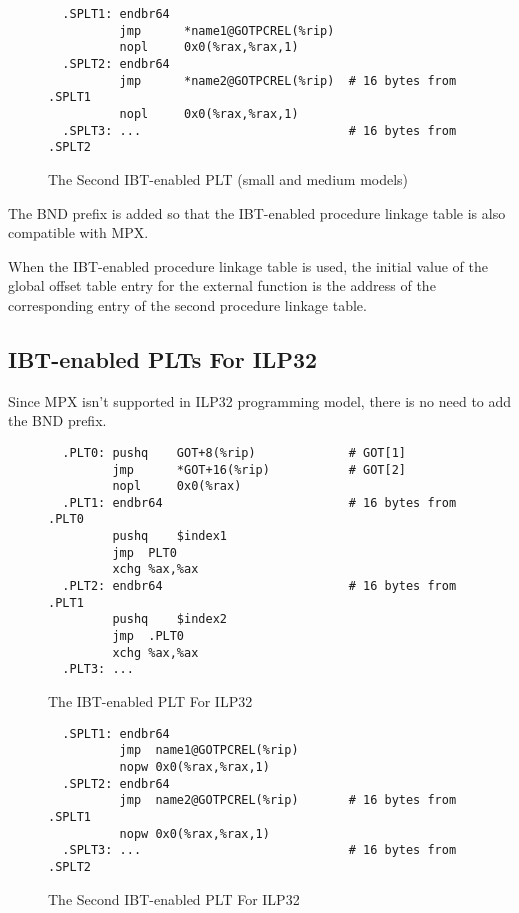 \begin{figure}[H]
\Hrule
\caption{The Second IBT-enabled PLT (small and medium models)}
\label{ibt_sec_small_med_plt}
\begin{footnotesize}
\begin{verbatim}
  .SPLT1: endbr64
          jmp      *name1@GOTPCREL(%rip)
          nopl     0x0(%rax,%rax,1)
  .SPLT2: endbr64
          jmp      *name2@GOTPCREL(%rip)  # 16 bytes from .SPLT1
          nopl     0x0(%rax,%rax,1)
  .SPLT3: ...                             # 16 bytes from .SPLT2
\end{verbatim}%
\end{footnotesize}
\Hrule
\end{figure}

The BND prefix is added so that the IBT-enabled procedure linkage table is
also compatible with MPX.

When the IBT-enabled procedure linkage table is used, the initial value of
the global offset table entry for the external function is the address of
the corresponding entry of the second procedure linkage table.

\subsection{IBT-enabled PLTs For ILP32}

Since MPX isn't supported in ILP32 programming model, there is no
need to add the BND prefix.

\begin{figure}[H]
\Hrule
\caption{The IBT-enabled PLT For ILP32}
\label{ibt_small_med_plt_ipl32}
\begin{footnotesize}
\begin{verbatim}
  .PLT0: pushq    GOT+8(%rip)             # GOT[1]
         jmp      *GOT+16(%rip)           # GOT[2]
         nopl     0x0(%rax)
  .PLT1: endbr64                          # 16 bytes from .PLT0
         pushq    $index1
         jmp  PLT0
         xchg %ax,%ax
  .PLT2: endbr64                          # 16 bytes from .PLT1
         pushq    $index2
         jmp  .PLT0
         xchg %ax,%ax
  .PLT3: ...
\end{verbatim}%
\end{footnotesize}
\Hrule
\end{figure}

\begin{figure}[H]
\Hrule
\caption{The Second IBT-enabled PLT For ILP32}
\label{ibt_sec_small_med_plt_ipl32}
\begin{footnotesize}
\begin{verbatim}
  .SPLT1: endbr64
          jmp  name1@GOTPCREL(%rip)
          nopw 0x0(%rax,%rax,1)
  .SPLT2: endbr64
          jmp  name2@GOTPCREL(%rip)       # 16 bytes from .SPLT1
          nopw 0x0(%rax,%rax,1)
  .SPLT3: ...                             # 16 bytes from .SPLT2
\end{verbatim}%
\end{footnotesize}
\Hrule
\end{figure}

